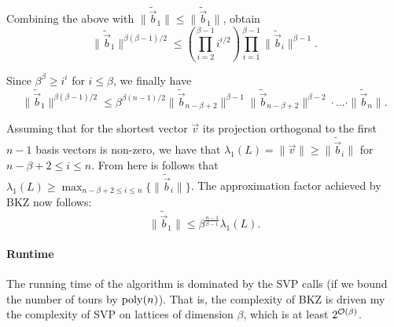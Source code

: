 Combining the above with $\|  \tilde{\vec{b}}_1  \| \leq \|  \tilde{\vec{b}}_1  \| $, obtain
\[
	\|  \tilde{\vec{b}}_1   \|^{\beta(\beta-1)/2} \leq \left( \prod_{i=2}^{\beta-1} i^{i/2} \right) \prod_{i=1}^{\beta-1} \|  \tilde{\vec{b}}_i  \|^{\beta-1}.
\]

Since $\beta^\beta \geq i^i$ for $i \leq \beta$, we finally have
\[
	\|  \tilde{\vec{b}}_1   \|^{\beta(\beta-1)/2} \leq \beta^{\beta(n-1)/2}  	\|  \tilde{\vec{b}}_{n-\beta+2}   \|^{\beta-1} \|  \tilde{\vec{b}}_{n-\beta+2}   \|^{\beta-2} \cdot \ldots \cdot  \|  \tilde{\vec{b}}_n\|.
\]

Assuming that for the shortest vector $\vec v$ its projection orthogonal to the first $n-1$ basis vectors is non-zero, we have that $\lambda_1(L) = \| \vec v \| \geq \| \tilde{\vec{b}}_i\|$ for $n-\beta+2\leq i\leq n$. From here is follows that $\lambda_1(L) \geq \max_{n-\beta+2\leq i\leq n}\{ \| \tilde{\vec{b}}_i\|\}$. The approximation factor achieved by BKZ now follows:
\[
	\|  \tilde{\vec{b}}_1   \| \leq \beta^{\frac{n-1}{\beta-1}}\lambda_1(L).
\]

\paragraph{Runtime} The running time of the algorithm is dominated by the SVP calls (if we bound the number of tours by $\operatorname{poly}(n)$). That is, the complexity of BKZ is driven my the complexity of SVP on lattices of dimension $\beta$, which is at least $2^{\mathcal{O}(\beta)}$.
